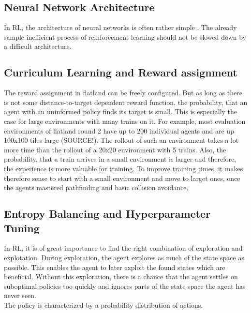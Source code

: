 \subsection*{Neural Network Architecture}\label{network_architecture}
In RL, the architecture of neural networks is often rather simple \cite{mnih2013playing}\cite{a3c}. The already sample inefficient process of reinforcement learning should not be slowed down by a difficult architecture.


\subsection*{Curriculum Learning and Reward assignment}\label{curriculum_learning}
The reward assignment in flatland can be freely configured. But as long as there is not some distance-to-target dependent reward function, the probability, that an agent with an uninformed policy finds its target is small. This is especially the case for large environments with many trains on it. For example, most evaluation environments of flatland round 2 have up to 200 individual agents and are up 100x100 tiles large (SOURCE!). The rollout of such an environment takes a lot more time than the rollout of a 20x20 environment with 5 trains. Also, the probability, that a train arrives in a small environment is larger and therefore, the experience is more valuable for training.
To improve training times, it makes therefore sense to start with a small environment and move to larget ones, once the agents mastered pathfinding and basic collision avoidance.

\subsection*{Entropy Balancing and Hyperparameter Tuning}\label{entropy_balancing_hyperparameter}
In RL, it is of great importance to find the right combination of exploration and explotation. During exploration, the agent explores as much of the state space as possible. This enables the agent to later exploit the found states which are beneficial. Without this exploration, there is a chance that the agent settles on suboptimal policies too quickly and ignores parts of the state space the agent has never seen.\\
The policy is characterized by a probability distribution of actions.

